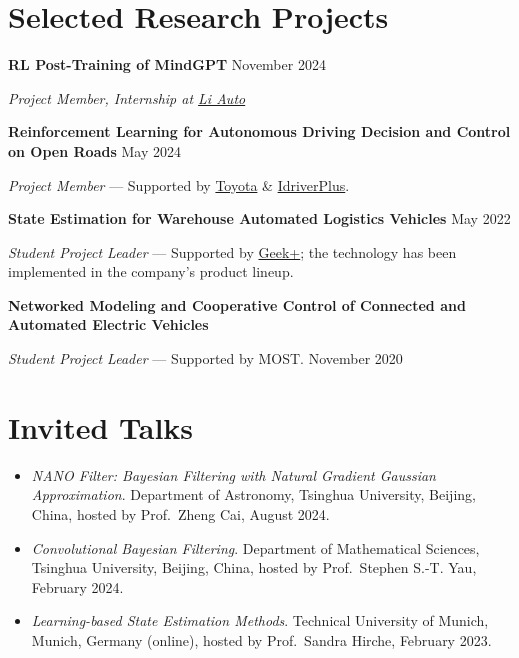 \documentclass[11pt,a4paper]{article}
\newlength{\gapS}\setlength{\gapS}{3pt plus 2pt minus 1pt}  %
\newlength{\gapM}\setlength{\gapM}{4pt plus 2pt minus 1pt}  %
\begin{document}
\section{Selected Research Projects}
\textbf{RL Post-Training of MindGPT} \hfill November 2024\par
{\itshape Project Member, Internship at \href{https://www.lixiang.com/}{Li Auto}}
\vspace{\gapM}

\textbf{Reinforcement Learning for Autonomous Driving Decision and Control on Open Roads} \hfill May 2024\par
{\itshape Project Member} --- Supported by \href{https://global.toyota/en/}{Toyota} \& \href{https://www.idriverplus.com/}{IdriverPlus}.
\vspace{\gapM}

\textbf{State Estimation for Warehouse Automated Logistics Vehicles} \hfill May 2022\par
{\itshape Student Project Leader} --- Supported by \href{https://www.geekplus.com/en/}{Geek+}; the technology has been implemented in the company's product lineup.
\vspace{\gapM}

\textbf{Networked Modeling and Cooperative Control of Connected and Automated Electric Vehicles}\par
{\itshape Student Project Leader} --- Supported by MOST. \hfill November 2020

\section{Invited Talks}
\begin{itemize}[leftmargin=1.4em,itemindent=-1.4em,labelsep=0pt,label={},itemsep=\gapS,parsep=0pt,topsep=3pt plus 1pt]\relax
\item \textit{NANO Filter: Bayesian Filtering with Natural Gradient Gaussian Approximation}. Department of Astronomy, Tsinghua University, Beijing, China, hosted by Prof.\ Zheng Cai, August 2024.
\item \textit{Convolutional Bayesian Filtering}. Department of Mathematical Sciences, Tsinghua University, Beijing, China, hosted by Prof.\ Stephen S.-T. Yau, February 2024.
\item \textit{Learning-based State Estimation Methods}. Technical University of Munich, Munich, Germany (online), hosted by Prof.\ Sandra Hirche, February 2023.
\end{itemize}
\end{document}
